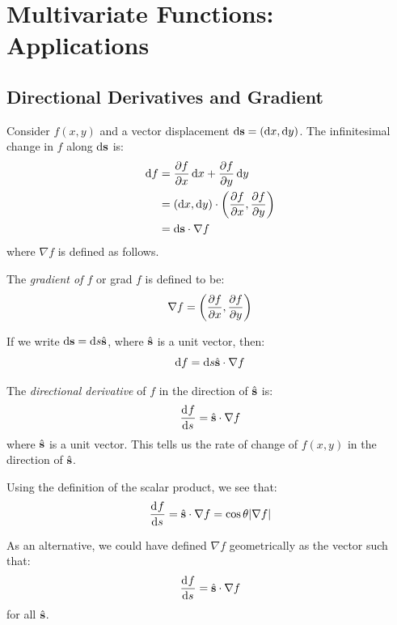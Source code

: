 \documentclass[../main.tex]{subfiles}
\begin{document}
\chapter{Multivariate Functions: Applications}
\section{Directional Derivatives and Gradient}
Consider $f(x, y)$ and a vector displacement $\d{\vec{s}}=(\d{x}, \d{y})$.
The infinitesimal change in $f$ along $\d{\vec{s}}$ is:
\begin{align*}
  \d{f} &= \pderiv{f}{x}\d{x} + \pderiv{f}{y}\d{y} \\
        &= (\d{x}, \d{y}) \cdot \left(\pderiv{f}{x}, \pderiv{f}{y}\right) \\
        &= \d{\vec{s}} \cdot \nabla f
\end{align*}
where $\nabla f$ is defined as follows.
\begin{definition}[Gradient of $f$]
  The  \textit{gradient of $f$} or grad $f$ is defined to be:
  \[
    \nabla f = \left(\pderiv{f}{x}, \pderiv{f}{y}\right)
  \]
\end{definition}
If we write $\d{\vec{s}} = \d{s}\uvec{s}$, where $\hat{\mathbf{\bm{s}}}$ is a unit vector, then:
\[
  \d{f} = \d{s}\uvec{s} \cdot \nabla f
\]
\begin{definition}
  The \textit{directional derivative} of $f$ in the direction of $\hat{\mathbf{\bm{s}}}$ is:
  \[
    \deriv{f}{s} = \uvec{s} \cdot \nabla f
  \]
  where $\hat{\mathbf{\bm{s}}}$ is a unit vector.
  This tells us the rate of change of $f(x, y)$ in the direction of $\hat{\mathbf{\bm{s}}}$.
\end{definition}
\begin{center}
\end{center}
Using the definition of the scalar product, we see that:
\[
  \deriv{f}{s} = \uvec{s} \cdot \nabla f = \cos \theta |\nabla f|
\]
\begin{remark}[Note]
  As an alternative, we could have defined $\nabla f$ geometrically as the vector such that:
  \[
    \deriv{f}{s} = \uvec{s} \cdot \nabla f
  \]
  for all $\hat{\mathbf{\bm{s}}}$.
\end{remark}
\end{document}
